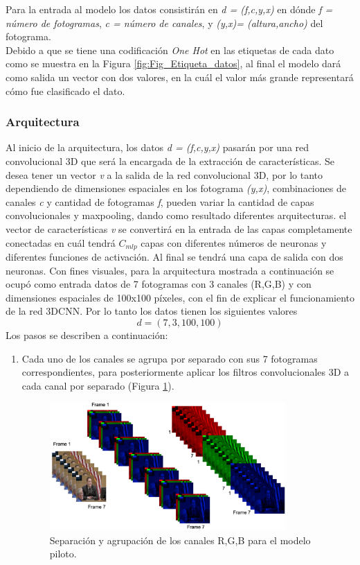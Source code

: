 \begin{onehalfspacing}
Para la entrada al modelo los datos consistirán en \textit{d = (f,c,y,x)} en dónde \textit{f = número de fotogramas}, \textit{c = número de canales}, y \textit{(y,x)= (altura,ancho)} del fotograma.\\
Debido a que se tiene una codificación \textit{One Hot} en las etiquetas de cada dato como se muestra en la Figura \ref{fig:Fig_Etiqueta_datos}, al final el modelo dará como salida un vector con dos valores, en la cuál el valor más grande representará cómo fue clasificado el dato.

\subsubsection{Arquitectura}
\label{sec:Arquitectura}

Al inicio de la arquitectura, los datos \textit{d = (f,c,y,x)} pasarán por una red convolucional 3D que será la encargada de la extracción de características. Se desea tener un vector \textit{v} a la salida de la red convolucional 3D, por lo tanto dependiendo de dimensiones espaciales en los fotograma \textit{(y,x)}, combinaciones de canales \textit{c} y cantidad de fotogramas \textit{f}, pueden variar la cantidad de capas convolucionales y maxpooling, dando como resultado diferentes arquitecturas. el vector de características \textit{v} se convertirá en la entrada de las capas completamente conectadas en cuál tendrá $C_{mlp}$ capas con diferentes números de neuronas y diferentes funciones de activación. Al final se tendrá una capa de salida con dos neuronas. Con fines visuales, para la arquitectura mostrada a continuación se ocupó como entrada datos de 7 fotogramas con 3 canales (R,G,B) y con dimensiones espaciales de 100x100 píxeles, con el fin de explicar el funcionamiento de la red 3DCNN. Por lo tanto los datos tienen los siguientes valores $${d = (7,3,100,100)}$$ Los pasos se describen a continuación:\\

\begin{enumerate}
    \item Cada uno de los canales se agrupa por separado con sus 7 fotogramas correspondientes, para posteriormente aplicar los filtros convolucionales 3D a cada canal por separado (Figura \ref{fig:Fig_Piloto_p1}).
    
    \begin{figure}[h!]
	\centering
	\includegraphics[width=9cm,keepaspectratio]{XX_Figures/Fig_Piloto_p1.png}
	\caption{\footnotesize Separación y agrupación de los canales R,G,B para el modelo piloto.}
	\label{fig:Fig_Piloto_p1}
    \end{figure}
    

\end{enumerate}
\end{onehalfspacing}
